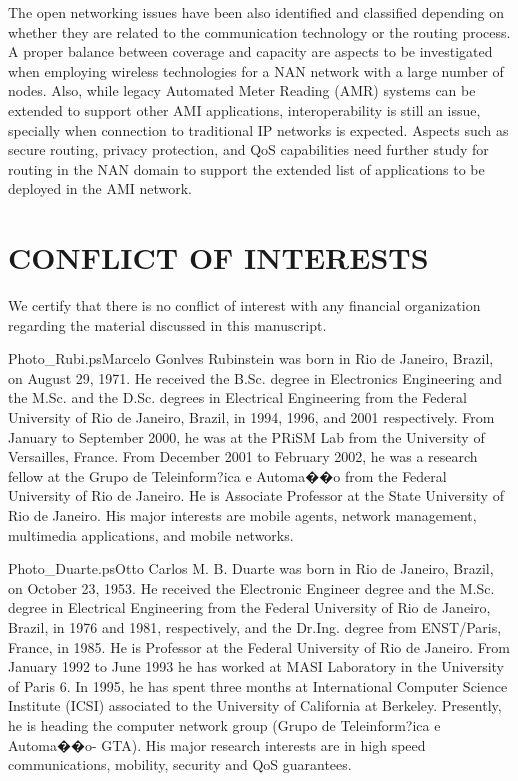 \documentclass[10pt,twocolumn,twoside,submit]{JCNtran}
\begin{document}
The open networking issues have been also identified and classified depending on whether they are related to the communication technology or the routing process. A proper balance between coverage and capacity are aspects to be investigated when employing wireless technologies for a NAN network with a large number of nodes. Also, while legacy Automated Meter Reading (AMR) systems can be extended to support other AMI applications, interoperability is still an issue, specially when connection to traditional IP networks is expected. Aspects such as secure routing, privacy protection, and QoS capabilities need further study for routing in the NAN domain to support the extended list of applications to be deployed in the AMI network. 

\vspace{10pt}
\section{\uppercase{Conflict of Interests}}
\label{sec:conflict}

We certify that there is no conflict of interest with any financial organization regarding the material discussed in this manuscript.


%



%


\epsfysize=3.2cm
\begin{biography}{Photo_Rubi.ps}{Marcelo Gonlves Rubinstein}
was born in Rio de Janeiro, Brazil, on August 29, 1971.
He received the B.Sc. degree in Electronics Engineering
and the M.Sc. and the D.Sc. degrees in Electrical Engineering from
the Federal University of Rio de Janeiro, Brazil, in 1994, 1996,
and 2001 respectively. From January to September 2000, he was at the PRiSM
Lab from the University of Versailles, France. From December 2001 to
February 2002, he was a research fellow at the Grupo de
Teleinform?ica e Automa��o from the Federal University of
Rio de Janeiro.
He is Associate Professor at the
State University of Rio de Janeiro. His major interests are
mobile agents, network management, multimedia applications, and
mobile networks.
\end{biography}

\epsfysize=3.2cm
\begin{biography}{Photo_Duarte.ps}{Otto Carlos M. B. Duarte} was born
in Rio de Janeiro, Brazil, on October 23, 1953. He received the
Electronic Engineer degree and the
M.Sc. degree in Electrical Engineering from the Federal University of
Rio de Janeiro, Brazil, in 1976 and 1981, respectively, and the
Dr.Ing. degree from ENST/Paris, France, in 1985. He is
Professor at the Federal University of Rio de Janeiro. From
January 1992 to June 1993 he has worked at MASI Laboratory in the
University of Paris 6. In 1995, he has spent three months at
International Computer Science Institute (ICSI) associated to the
University of California at Berkeley.
Presently, he is heading the computer network group (Grupo de
Teleinform?ica e Automa��o- GTA).
His major research interests are in high
speed communications, mobility, security and QoS guarantees.
\end{biography}
\end{document}

